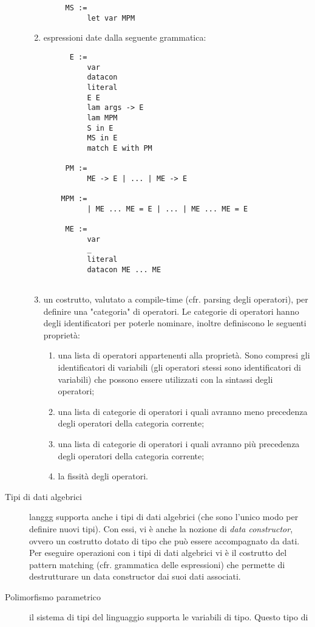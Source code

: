 \documentclass[10pt,a4paper]{article}
\begin{document}
\begin{description}
\begin{enumerate}
\begin{lstlisting}
     MS :=
          let var MPM
    \end{lstlisting}
    \item espressioni date dalla seguente grammatica:
    \begin{lstlisting}
      E :=
          var
          datacon
          literal
          E E
          lam args -> E
          lam MPM
          S in E
          MS in E
          match E with PM

     PM :=
          ME -> E | ... | ME -> E

    MPM :=
          | ME ... ME = E | ... | ME ... ME = E

     ME :=
          var
          _
          literal
          datacon ME ... ME
          
    \end{lstlisting}
    \item un costrutto, valutato a compile-time (cfr. parsing degli operatori), per definire una "categoria" di
    operatori. Le categorie di operatori hanno degli identificatori per poterle nominare, inoltre definiscono le
    seguenti proprietà:
        \begin{enumerate}
        \item una lista di operatori appartenenti alla proprietà. Sono compresi gli identificatori di variabili (gli
        operatori stessi sono identificatori di variabili) che possono essere utilizzati con la sintassi degli operatori;
        \item una lista di categorie di operatori i quali avranno meno precedenza degli operatori della categoria
        corrente;
        \item una lista di categorie di operatori i quali avranno più precedenza degli operatori della categoria
        corrente;
        \item la fissità degli operatori.
        \end{enumerate}
    \end{enumerate}
\item[Tipi di dati algebrici] langgg supporta anche i tipi di dati algebrici (che sono l'unico modo per definire nuovi
tipi). Con essi, vi è anche la nozione di \textit{data constructor}, ovvero un costrutto dotato di tipo che può essere
accompagnato da dati. Per eseguire operazioni con i tipi di dati algebrici vi è il costrutto del pattern matching
(cfr. grammatica delle espressioni) che permette di destrutturare un data constructor dai suoi dati associati.
\item[Polimorfismo parametrico] il sistema di tipi del linguaggio supporta le variabili di tipo. Questo tipo di

\end{description}
\end{document}
